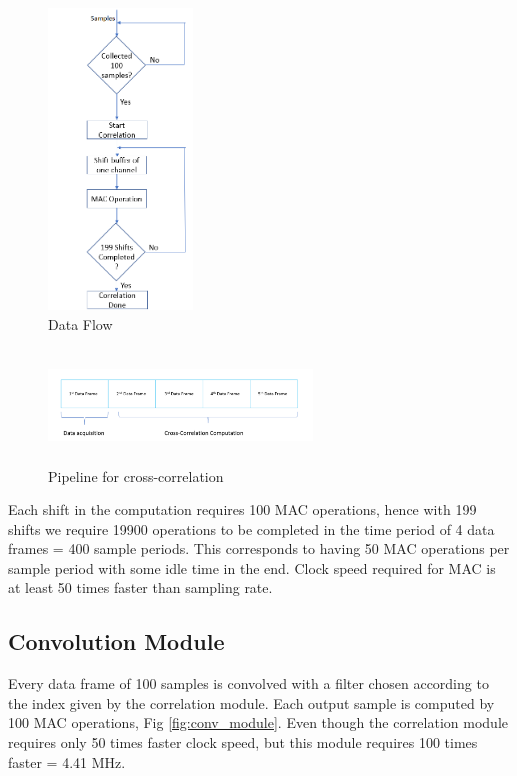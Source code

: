 \documentclass[conference]{IEEEtran}
\begin{document}
\begin{figure}
    \centering
    \includegraphics[height = 8cm]{xcorr_flow.png}
    \caption{Data Flow}
    \label{fig:xcorrflow}
\end{figure}

\begin{figure}
    \centering
    \includegraphics[height = 3cm, width = 7cm]{modified_xcorr.png}
    \caption{Pipeline for cross-correlation}
    \label{fig:modxcorr}
\end{figure}

Each shift in the computation requires 100 MAC operations, hence with 199 shifts we require 19900 operations to be completed in the time period of 4 data frames = 400 sample periods. This corresponds to having 50 MAC operations per sample period with some idle time in the end. Clock speed required for MAC is at least 50 times faster than sampling rate.

\subsection{Convolution Module}
Every data frame of 100 samples is convolved with a filter chosen according to the index given by the correlation module. Each output sample is computed by 100 MAC operations, Fig \ref{fig:conv_module}. Even though the correlation module requires only 50 times faster clock speed, but this module requires 100 times faster = 4.41 MHz. 
\end{document}
